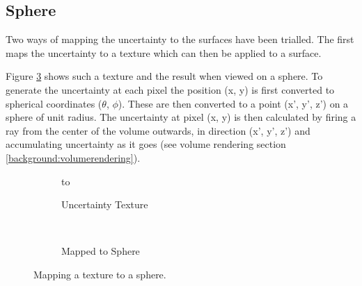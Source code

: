 \subsection*{Sphere}
Two ways of mapping the uncertainty to the surfaces have been trialled. The first maps the uncertainty to a texture which can then be applied to a surface. 

Figure \ref{fig:uncertaintytexture} shows such a texture and the result when viewed on a sphere. To generate the uncertainty at each pixel the position (x, y) is first converted to spherical coordinates ($\theta$, $\phi$). These are then converted to a point (x', y', z') on a sphere of unit radius. The uncertainty at pixel (x, y) is then calculated by firing a ray from the center of the volume outwards, in direction (x', y', z') and accumulating uncertainty as it goes (see volume rendering section \ref{background:volumerendering}).


\begin{figure}[H]
  \centering
  \begin{subfigure}[b]{0.5\textwidth}
    \vbox to \ht{}
    \caption{Uncertainty Texture}
    \label{fig:texturetexture}
  \end{subfigure}%
  ~ %
  \begin{subfigure}[b]{0.5\textwidth}
    \usebox{\mybox}
    \caption{Mapped to Sphere}
    \label{fig:texturesphere}
  \end{subfigure}
  \caption{Mapping a texture to a sphere.}\label{fig:uncertaintytexture}
\end{figure}

